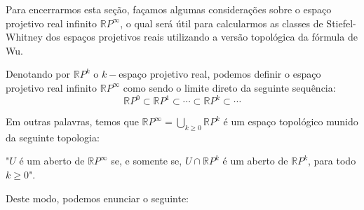 \documentclass[12pt,oneside]{book} %
\newcommand{\ds}{\displaystyle}
\newcommand{\RP}{\mathbb{R}P}
\begin{document}
\par Para encerrarmos esta seção, façamos algumas considerações sobre o espaço projetivo real infinito $\RP^{\infty}$, o qual será útil para calcularmos as classes de Stiefel-Whitney dos espaços projetivos reais utilizando a versão topológica da fórmula de Wu.

\par Denotando por $\RP^{k}$ o $k-$espaço projetivo real, podemos definir o espaço projetivo real infinito $\RP^{\infty}$ como sendo o limite direto da seguinte sequência:
$$ \RP^{0} \subset \RP^{1} \subset \cdots \subset \RP^{k} \subset \cdots $$

\par Em outras palavras, temos que $\RP^{\infty}=\ds\bigcup_{k\geq 0}\RP^{k}$ é um espaço topológico munido da seguinte topologia:

\begin{center}
	"$U$ é um aberto de $\RP^{\infty}$  se, e somente se, $U\cap\RP^{k}$ é um aberto de $\RP^{k}$, para todo $k\geq 0$".
\end{center}

\par Deste modo, podemos enunciar o seguinte:
\end{document}
